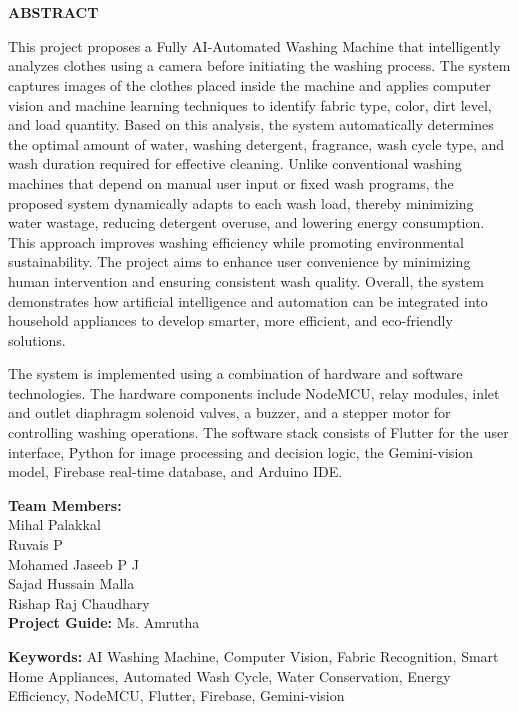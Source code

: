 \chapter*{}
\thispagestyle{footeronly}
\begin{center}
{\Large \textbf{ABSTRACT}}
\end{center}

\noindent
This project proposes a Fully AI-Automated Washing Machine that intelligently analyzes clothes using a camera before initiating the washing process. The system captures images of the clothes placed inside the machine and applies computer vision and machine learning techniques to identify fabric type, color, dirt level, and load quantity. Based on this analysis, the system automatically determines the optimal amount of water, washing detergent, fragrance, wash cycle type, and wash duration required for effective cleaning. Unlike conventional washing machines that depend on manual user input or fixed wash programs, the proposed system dynamically adapts to each wash load, thereby minimizing water wastage, reducing detergent overuse, and lowering energy consumption. This approach improves washing efficiency while promoting environmental sustainability. The project aims to enhance user convenience by minimizing human intervention and ensuring consistent wash quality. Overall, the system demonstrates how artificial intelligence and automation can be integrated into household appliances to develop smarter, more efficient, and eco-friendly solutions.

\noindent
The system is implemented using a combination of hardware and software technologies. The hardware components include NodeMCU, relay modules, inlet and outlet diaphragm solenoid valves, a buzzer, and a stepper motor for controlling washing operations. The software stack consists of Flutter for the user interface, Python for image processing and decision logic, the Gemini-vision model, Firebase real-time database, and Arduino IDE.

\vspace{0.5cm}
\noindent
\textbf{Team Members:} \\
Mihal Palakkal \\
Ruvais P \\
Mohamed Jaseeb P J \\
Sajad Hussain Malla \\
Rishap Raj Chaudhary \\

\noindent
\textbf{Project Guide:} Ms. Amrutha

\vspace{0.5cm}
\noindent
\textbf{Keywords:} AI Washing Machine, Computer Vision, Fabric Recognition, Smart Home Appliances, Automated Wash Cycle, Water Conservation, Energy Efficiency, NodeMCU, Flutter, Firebase, Gemini-vision